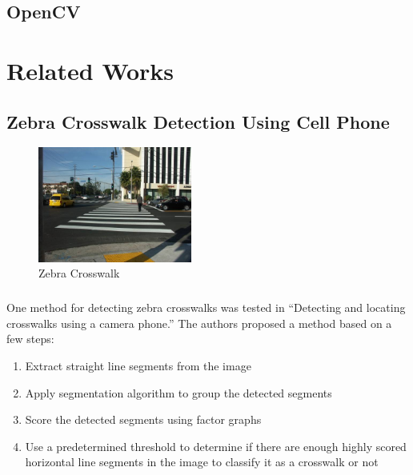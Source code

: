\documentclass[12pt]{ucthesis}
\begin{document}
\section{OpenCV}

\chapter{Related Works}
\label{Related Works}

\section{Zebra Crosswalk Detection Using Cell Phone}

\begin{figure}[htp]
  \centering
  \begin{center}
    \includegraphics[width=0.45\textwidth]{Zebra.jpg}
    \caption{Zebra Crosswalk}
    \label{fig:Zebra}
  \end{center}
\end{figure}

\paragraph{}
One method for detecting zebra crosswalks was tested in ``Detecting and locating crosswalks using a camera phone\cite{ZebraPhone}.'' The authors proposed a method based on a few steps:
\begin{enumerate}
  \item Extract straight line segments from the image
  \item Apply segmentation algorithm to group the detected segments
  \item Score the detected segments using factor graphs
  \item Use a predetermined threshold to determine if there are enough highly scored horizontal line segments in the image to classify it as a crosswalk or not
\end{enumerate}
\end{document}
